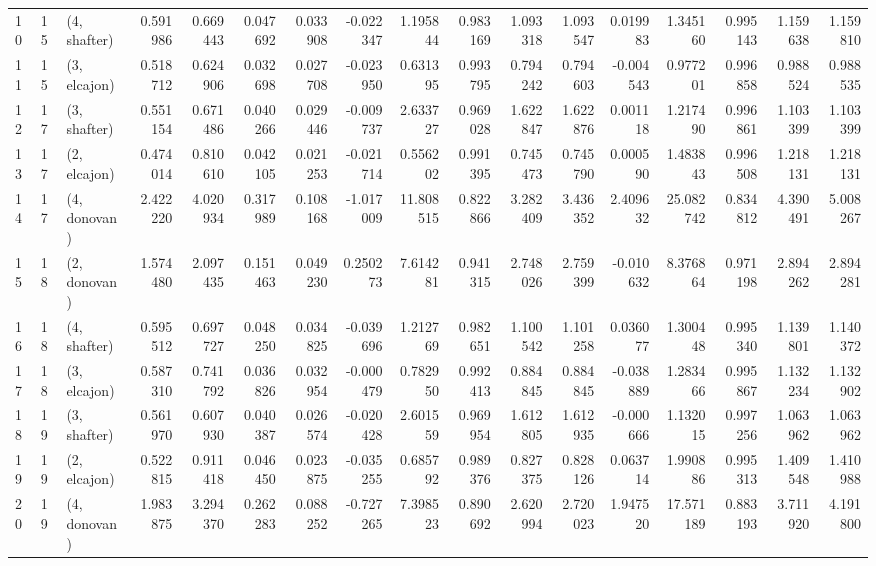 \begin{tabular}{lllrrrrrrrrrrrrrr}
10 &    15 &  (4, shafter) &  0.591986 &  0.669443 &   0.047692 &  0.033908 & -0.022347 &   1.195844 &  0.983169 &   1.093318 &  1.093547 &  0.019983 &   1.345160 &  0.995143 &  1.159638 &  1.159810 \\
11 &    15 &  (3, elcajon) &  0.518712 &  0.624906 &   0.032698 &  0.027708 & -0.023950 &   0.631395 &  0.993795 &   0.794242 &  0.794603 & -0.004543 &   0.977201 &  0.996858 &  0.988524 &  0.988535 \\
12 &    17 &  (3, shafter) &  0.551154 &  0.671486 &   0.040266 &  0.029446 & -0.009737 &   2.633727 &  0.969028 &   1.622847 &  1.622876 &  0.001118 &   1.217490 &  0.996861 &  1.103399 &  1.103399 \\
13 &    17 &  (2, elcajon) &  0.474014 &  0.810610 &   0.042105 &  0.021253 & -0.021714 &   0.556202 &  0.991395 &   0.745473 &  0.745790 &  0.000590 &   1.483843 &  0.996508 &  1.218131 &  1.218131 \\
14 &    17 &  (4, donovan) &  2.422220 &  4.020934 &   0.317989 &  0.108168 & -1.017009 &  11.808515 &  0.822866 &   3.282409 &  3.436352 &  2.409632 &  25.082742 &  0.834812 &  4.390491 &  5.008267 \\
15 &    18 &  (2, donovan) &  1.574480 &  2.097435 &   0.151463 &  0.049230 &  0.250273 &   7.614281 &  0.941315 &   2.748026 &  2.759399 & -0.010632 &   8.376864 &  0.971198 &  2.894262 &  2.894281 \\
16 &    18 &  (4, shafter) &  0.595512 &  0.697727 &   0.048250 &  0.034825 & -0.039696 &   1.212769 &  0.982651 &   1.100542 &  1.101258 &  0.036077 &   1.300448 &  0.995340 &  1.139801 &  1.140372 \\
17 &    18 &  (3, elcajon) &  0.587310 &  0.741792 &   0.036826 &  0.032954 & -0.000479 &   0.782950 &  0.992413 &   0.884845 &  0.884845 & -0.038889 &   1.283466 &  0.995867 &  1.132234 &  1.132902 \\
18 &    19 &  (3, shafter) &  0.561970 &  0.607930 &   0.040387 &  0.026574 & -0.020428 &   2.601559 &  0.969954 &   1.612805 &  1.612935 & -0.000666 &   1.132015 &  0.997256 &  1.063962 &  1.063962 \\
19 &    19 &  (2, elcajon) &  0.522815 &  0.911418 &   0.046450 &  0.023875 & -0.035255 &   0.685792 &  0.989376 &   0.827375 &  0.828126 &  0.063714 &   1.990886 &  0.995313 &  1.409548 &  1.410988 \\
20 &    19 &  (4, donovan) &  1.983875 &  3.294370 &   0.262283 &  0.088252 & -0.727265 &   7.398523 &  0.890692 &   2.620994 &  2.720023 &  1.947520 &  17.571189 &  0.883193 &  3.711920 &  4.191800 \\

\end{tabular}
